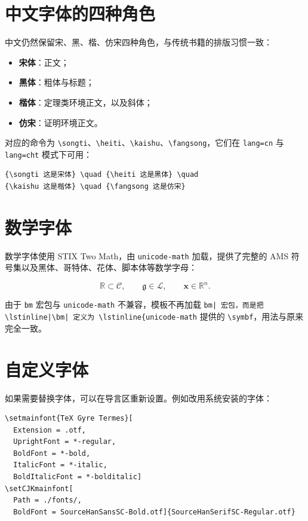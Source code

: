 \documentclass[lang=cn,10pt,scheme=chinese]{boyogalaelegantbook}
\begin{document}
\section{中文字体的四种角色}

中文仍然保留宋、黑、楷、仿宋四种角色，与传统书籍的排版习惯一致：

\begin{itemize}
  \item \textbf{宋体}：正文；
  \item \textbf{黑体}：粗体与标题；
  \item \textbf{楷体}：定理类环境正文，以及斜体；
  \item \textbf{仿宋}：证明环境正文。
\end{itemize}

对应的命令为 \lstinline|\songti|、\lstinline|\heiti|、\lstinline|\kaishu|、\lstinline|\fangsong|，它们在 \lstinline|lang=cn| 与 \lstinline|lang=cht| 模式下可用：

\begin{lstlisting}
{\songti 这是宋体} \quad {\heiti 这是黑体} \quad
{\kaishu 这是楷体} \quad {\fangsong 这是仿宋}
\end{lstlisting}

\section{数学字体}

数学字体使用 STIX Two Math，由 \lstinline{unicode-math} 加载，提供了完整的 AMS 符号集以及黑体、哥特体、花体、脚本体等数学字母：

\begin{equation}
  \mathbb{R} \subset \mathcal{C}, \qquad
  \mathfrak{g} \in \mathscr{L}, \qquad
  \bm{x} \in \mathbb{R}^n.
\end{equation}

由于 \lstinline{bm} 宏包与 \lstinline{unicode-math} 不兼容，模板不再加载 \lstinline{bm| 宏包，而是把 \lstinline|\bm| 定义为 \lstinline{unicode-math} 提供的 \lstinline|\symbf|，用法与原来完全一致。

\section{自定义字体}

如果需要替换字体，可以在导言区重新设置。例如改用系统安装的字体：

\begin{lstlisting}
\setmainfont{TeX Gyre Termes}[
  Extension = .otf,
  UprightFont = *-regular,
  BoldFont = *-bold,
  ItalicFont = *-italic,
  BoldItalicFont = *-bolditalic]
\setCJKmainfont[
  Path = ./fonts/,
  BoldFont = SourceHanSansSC-Bold.otf]{SourceHanSerifSC-Regular.otf}
\end{lstlisting}
\end{document}
